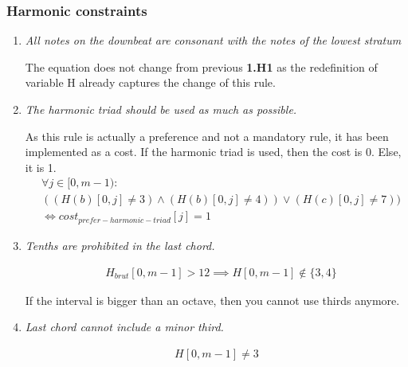 \subsubsection{Harmonic constraints}
\begin{enumerate}[wide, label=\bfseries 1.H\arabic*]        
    \item\label{constraint:consonant} \textit{All notes on the downbeat are consonant with the notes of the lowest stratum}

    The equation does not change from previous \textbf{1.H1} as the redefinition of variable H already captures the change of this rule.

   \setcounter{enumi}{7} 

    \item\label{constraint:harmonic-triad} \reddot \textit{The harmonic triad should be used as much as possible.}
    
    As this rule is actually a preference and not a mandatory rule, it has been implemented as a cost. If the harmonic triad is used, then the cost is 0. Else, it is 1.
    \begin{equation}
    \begin{aligned}
    &\forall j \in [0, m-1) \colon \\
    &((H(b)[0, j] \neq 3) \land (H(b)[0, j] \neq 4)) \lor (H(c)[0, j]  \neq 7)) \\
    &\iff cost_{prefer-harmonic-triad}[j] = 1
    \end{aligned}
    \end{equation}
    
    \addtocounter{enumi}{1} 


    \item\label{constraint:tenth-is-last-chord} \reddot \textit{Tenths are prohibited in the last chord.}

    \begin{equation} \begin{aligned}
    &H_{brut}[0, m-1] > 12 \implies H[0, m-1] \notin \{3, 4\}
    \end{aligned} \end{equation}

    If the interval is bigger than an octave, then you cannot use thirds anymore.

    \addtocounter{enumi}{1} 

    \item\label{constraint:minor-third} \reddot \textit{Last chord cannot include a minor third.}

    \begin{equation} \begin{aligned}
    H[0, m-1] \neq 3
    \end{aligned} \end{equation}
\end{enumerate}

